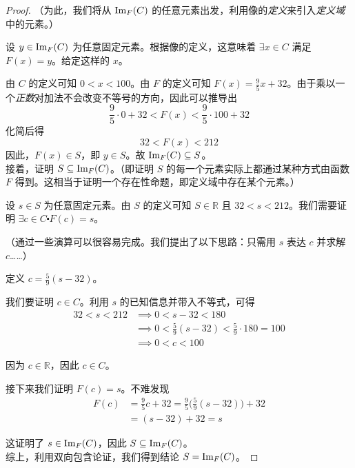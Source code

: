 \begin{example}
\begin{proof}
        （为此，我们将从 $\text{Im}_F (C)$ 的任意元素出发，利用像的\emph{定义}来引入\emph{定义域}中的元素。）

        设 $y \in \text{Im}_F (C)$ 为任意固定元素。根据像的定义，这意味着 $\exists x \in C$ 满足 $F(x) = y$。给定这样的 $x$。

        由 $C$ 的定义可知 $ 0 < x < 100$。由 $F$ 的定义可知 $F(x) = \frac{9}{5}x + 32$。由于乘以一个\emph{正数}对加法不会改变不等号的方向，因此可以推导出
        \[ \frac{9}{5} \cdot 0 + 32 < F(x) <  \frac{9}{5} \cdot 100 + 32\]
        化简后得
        \[32 < F(x) < 212\]
        因此，$F(x) \in S$，即 $y \in S$。故 $\text{Im}_F(C) \subseteq S$。\\
        
        接着，证明 $S \subseteq \text{Im}_F (C)$。（即证明 $S$ 的每一个元素实际上都通过某种方式由函数 $F$ 得到。这相当于证明一个存在性命题，即定义域中存在某个元素。）

        设 $s \in S$ 为任意固定元素。由 $S$ 的定义可知 $S \in \mathbb{R}$ 且 $32 < s < 212$。我们需要证明 $\exists c \in C \centerdot F(c) = s$。

        （通过一些演算可以很容易完成。我们提出了以下思路：只需用 $s$ 表达 $c$ 并求解 $c$……）

        定义 $c = \frac{5}{9}(s-32)$。

        我们要证明 $c \in C$。利用 $s$ 的已知信息并带入不等式，可得
        \begin{align*}
            32 < s < 212 &\implies 0 < s - 32 < 180 \\
            &\implies 0 < \frac{5}{9}(s - 32) < \frac{5}{9} \cdot 180 = 100 \\
            &\implies 0 < c < 100
        \end{align*}

        因为 $c \in \mathbb{R}$，因此 $c \in C$。

        接下来我们证明 $F(c) = s$。不难发现
        \begin{align*}
            F(c) &= \frac{9}{5}c + 32 = \frac{9}{5}\Big(\frac{5}{9}(s-32)\Big)+32\\
            &= (s - 32) + 32 = s
        \end{align*}

        这证明了 $s \in \text{Im}_F (C)$，因此 $S \subseteq \text{Im}_F (C)$。\\

        综上，利用双向包含论证，我们得到结论 $S = \text{Im}_F (C)$。
    \end{proof}
\end{example}

